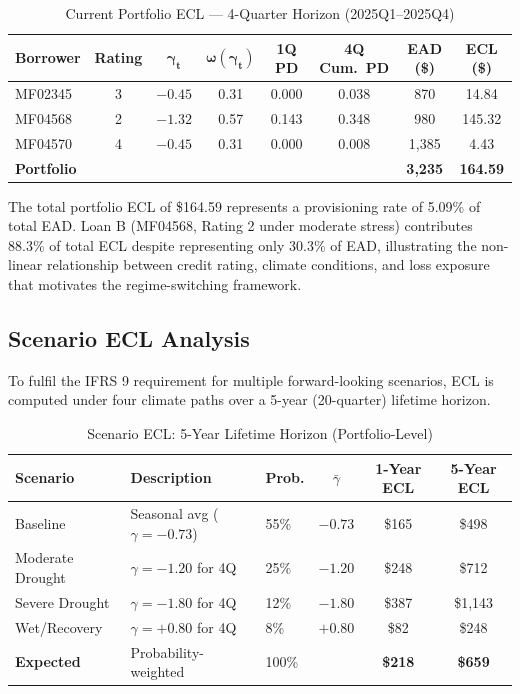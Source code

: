 \documentclass[12pt,a4paper]{article}
\begin{document}
\begin{table}[H]
\centering
\caption{Current Portfolio ECL --- 4-Quarter Horizon (2025Q1--2025Q4)}
\label{tab:current_ecl}
\begin{tabular}{@{}lccccccc@{}}
\toprule
\textbf{Borrower} & \textbf{Rating} & $\boldsymbol{\gamma_t}$ & $\boldsymbol{\omega(\gamma_t)}$ & \textbf{1Q PD} & \textbf{4Q Cum.\ PD} & \textbf{EAD (\$)} & \textbf{ECL (\$)} \\
\midrule
MF02345 & 3 & $-0.45$ & 0.31 & 0.000 & 0.038 & 870 & 14.84 \\
MF04568 & 2 & $-1.32$ & 0.57 & 0.143 & 0.348 & 980 & 145.32 \\
MF04570 & 4 & $-0.45$ & 0.31 & 0.000 & 0.008 & 1{,}385 & 4.43 \\
\midrule
\textbf{Portfolio} & & & & & & \textbf{3,235} & \textbf{164.59} \\
\bottomrule
\end{tabular}
\end{table}

The total portfolio ECL of \$164.59 represents a provisioning rate of 5.09\% of total EAD. Loan B (MF04568, Rating 2 under moderate stress) contributes 88.3\% of total ECL despite representing only 30.3\% of EAD, illustrating the non-linear relationship between credit rating, climate conditions, and loss exposure that motivates the regime-switching framework.

\subsection{Scenario ECL Analysis}

To fulfil the IFRS 9 requirement for multiple forward-looking scenarios, ECL is computed under four climate paths over a 5-year (20-quarter) lifetime horizon.

\begin{table}[H]
\centering
\caption{Scenario ECL: 5-Year Lifetime Horizon (Portfolio-Level)}
\label{tab:scenario_ecl_results}
\begin{tabular}{@{}lllccc@{}}
\toprule
\textbf{Scenario} & \textbf{Description} & \textbf{Prob.} & \textbf{$\bar{\gamma}$} & \textbf{1-Year ECL} & \textbf{5-Year ECL} \\
\midrule
Baseline & Seasonal avg ($\gamma = -0.73$) & 55\% & $-0.73$ & \$165 & \$498 \\
Moderate Drought & $\gamma = -1.20$ for 4Q & 25\% & $-1.20$ & \$248 & \$712 \\
Severe Drought & $\gamma = -1.80$ for 4Q & 12\% & $-1.80$ & \$387 & \$1{,}143 \\
Wet/Recovery & $\gamma = +0.80$ for 4Q & 8\% & $+0.80$ & \$82 & \$248 \\
\midrule
\textbf{Expected} & Probability-weighted & 100\% & & \textbf{\$218} & \textbf{\$659} \\
\bottomrule
\end{tabular}
\end{table}
\end{document}
